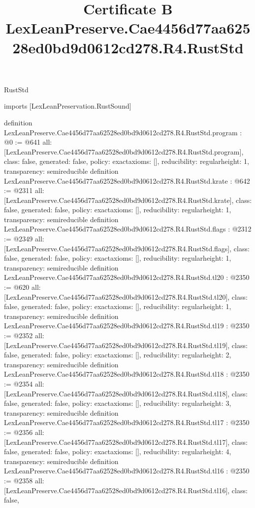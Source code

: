 \begin{lexlean}{RustStd}
\title{Certificate B LexLeanPreserve.Cae4456d77aa62528ed0bd9d0612cd278.R4.RustStd}
\begin{coremodule}
imports [LexLeanPreservation.RustSound]

definition LexLeanPreserve.Cae4456d77aa62528ed0bd9d0612cd278.R4.RustStd.program : @0 := @641 {
  all: [LexLeanPreserve.Cae4456d77aa62528ed0bd9d0612cd278.R4.RustStd.program],
  class: false,
  generated: false,
  policy: exact{axioms: []},
  reducibility: regular{height: 1},
  transparency: semireducible
}
definition LexLeanPreserve.Cae4456d77aa62528ed0bd9d0612cd278.R4.RustStd.krate : @642 := @2311 {
  all: [LexLeanPreserve.Cae4456d77aa62528ed0bd9d0612cd278.R4.RustStd.krate],
  class: false,
  generated: false,
  policy: exact{axioms: []},
  reducibility: regular{height: 1},
  transparency: semireducible
}
definition LexLeanPreserve.Cae4456d77aa62528ed0bd9d0612cd278.R4.RustStd.flags : @2312 := @2349 {
  all: [LexLeanPreserve.Cae4456d77aa62528ed0bd9d0612cd278.R4.RustStd.flags],
  class: false,
  generated: false,
  policy: exact{axioms: []},
  reducibility: regular{height: 1},
  transparency: semireducible
}
definition LexLeanPreserve.Cae4456d77aa62528ed0bd9d0612cd278.R4.RustStd.tl20 : @2350 := @620 {
  all: [LexLeanPreserve.Cae4456d77aa62528ed0bd9d0612cd278.R4.RustStd.tl20],
  class: false,
  generated: false,
  policy: exact{axioms: []},
  reducibility: regular{height: 1},
  transparency: semireducible
}
definition LexLeanPreserve.Cae4456d77aa62528ed0bd9d0612cd278.R4.RustStd.tl19 : @2350 := @2352 {
  all: [LexLeanPreserve.Cae4456d77aa62528ed0bd9d0612cd278.R4.RustStd.tl19],
  class: false,
  generated: false,
  policy: exact{axioms: []},
  reducibility: regular{height: 2},
  transparency: semireducible
}
definition LexLeanPreserve.Cae4456d77aa62528ed0bd9d0612cd278.R4.RustStd.tl18 : @2350 := @2354 {
  all: [LexLeanPreserve.Cae4456d77aa62528ed0bd9d0612cd278.R4.RustStd.tl18],
  class: false,
  generated: false,
  policy: exact{axioms: []},
  reducibility: regular{height: 3},
  transparency: semireducible
}
definition LexLeanPreserve.Cae4456d77aa62528ed0bd9d0612cd278.R4.RustStd.tl17 : @2350 := @2356 {
  all: [LexLeanPreserve.Cae4456d77aa62528ed0bd9d0612cd278.R4.RustStd.tl17],
  class: false,
  generated: false,
  policy: exact{axioms: []},
  reducibility: regular{height: 4},
  transparency: semireducible
}
definition LexLeanPreserve.Cae4456d77aa62528ed0bd9d0612cd278.R4.RustStd.tl16 : @2350 := @2358 {
  all: [LexLeanPreserve.Cae4456d77aa62528ed0bd9d0612cd278.R4.RustStd.tl16],
  class: false,
}
\end{coremodule}
\end{lexlean}
